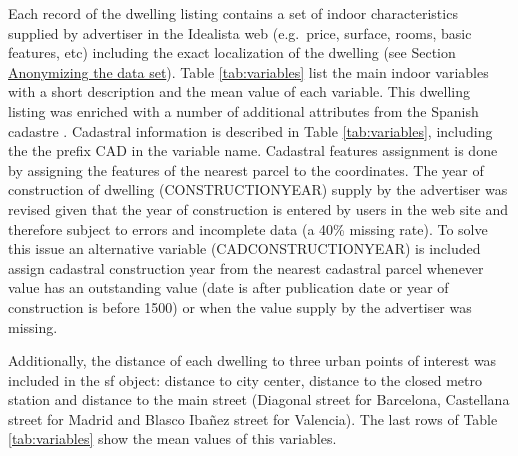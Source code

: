\documentclass[Royal,times,sageh]{sagej}
\begin{document}
Each record of the dwelling listing contains a set of indoor
characteristics supplied by advertiser in the Idealista web (e.g.~price,
surface, rooms, basic features, etc) including the exact localization of
the dwelling (see Section \protect\hyperlink{anonymizing}{Anonymizing
the data set}). Table \ref{tab:variables} list the main indoor variables
with a short description and the mean value of each variable. This
dwelling listing was enriched with a number of additional attributes
from the Spanish cadastre \citep{Catastro}. Cadastral information is
described in Table \ref{tab:variables}, including the the prefix CAD in
the variable name. Cadastral features assignment is done by assigning
the features of the nearest parcel to the coordinates. The year of
construction of dwelling (CONSTRUCTIONYEAR) supply by the advertiser was
revised given that the year of construction is entered by users in the
web site and therefore subject to errors and incomplete data (a 40\%
missing rate). To solve this issue an alternative variable
(CADCONSTRUCTIONYEAR) is included assign cadastral construction year
from the nearest cadastral parcel whenever value has an outstanding
value (date is after publication date or year of construction is before
1500) or when the value supply by the advertiser was missing.

Additionally, the distance of each dwelling to three urban points of
interest was included in the sf object: distance to city center,
distance to the closed metro station and distance to the main street
(Diagonal street for Barcelona, Castellana street for Madrid and Blasco
Ibañez street for Valencia). The last rows of Table \ref{tab:variables}
show the mean values of this variables.
\end{document}

